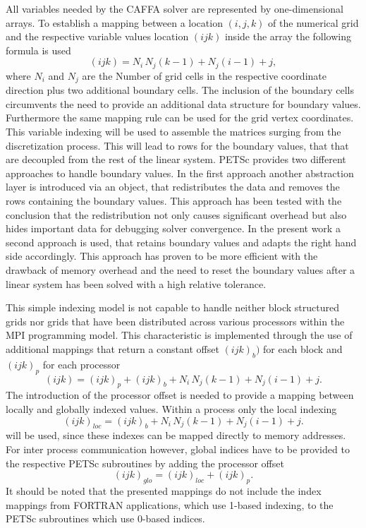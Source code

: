 All variables needed by the CAFFA solver are represented by one-dimensional arrays. To establish a mapping between a location \((i,j,k)\) of the numerical grid and the respective variable values location \((ijk)\) inside the array the following formula is used
\begin{displaymath}
  (ijk) = N_i \, N_j \left(k - 1\right) + N_j \left(i - 1\right) + j,
\end{displaymath}
where \(N_i\) and \(N_j\) are the Number of grid cells in the respective coordinate direction plus two additional boundary cells. The inclusion of the boundary cells circumvents the need to provide an additional data structure for boundary values. Furthermore the same mapping rule can be used for the grid vertex coordinates. This variable indexing will be used to assemble the matrices surging from the discretization process. This will lead to rows for the boundary values, that that are decoupled from the rest of the linear system. PETSc provides two different approaches to handle boundary values. In the first approach another abstraction layer is introduced via an object, that redistributes the data and removes the rows containing the boundary values. This approach has been tested with the conclusion that the redistribution not only causes significant overhead but also hides important data for debugging solver convergence. In the present work a second approach is used, that retains boundary values and adapts the right hand side accordingly. This approach has proven to be more efficient with the drawback of memory overhead and the need to reset the boundary values after a linear system has been solved with a high relative tolerance.

This simple indexing model is not capable to handle neither block structured grids nor grids that have been distributed across various processors within the MPI programming model. This characteristic is implemented through the use of additional mappings that return a constant offset \((ijk)_b)\) for each block and \((ijk)_p\) for each processor
\begin{displaymath}
  (ijk) = (ijk)_p + (ijk)_b +  N_i \, N_j \left(k - 1\right) + N_j \left(i - 1\right) + j.
\end{displaymath}
The introduction of the processor offset is needed to provide a mapping between locally and globally indexed values. Within a process only the local indexing 
\begin{displaymath}
  (ijk)_{loc} = (ijk)_b +  N_i \, N_j \left(k - 1\right) + N_j \left(i - 1\right) + j.
\end{displaymath}
will be used, since these indexes can be mapped directly to memory addresses. For inter process communication however, global indices have to be provided to the respective PETSc subroutines by adding the processor offset
\begin{equation}
  \label{eq:globalmap}
  (ijk)_{glo} = (ijk)_{loc} + (ijk)_p.
\end{equation}
It should be noted that the presented mappings do not include the index mappings from FORTRAN applications, which use 1-based indexing, to the PETSc subroutines which use 0-based indices.

